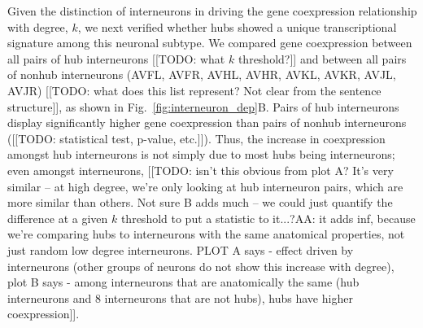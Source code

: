 \documentclass[10pt,letterpaper]{article}
\begin{document}
Given the distinction of interneurons in driving the gene coexpression relationship with degree, $k$, we next verified whether hubs showed a unique transcriptional signature among this neuronal subtype.
We compared gene coexpression between all pairs of hub interneurons [[TODO: what $k$ threshold?]] and between all pairs of nonhub interneurons (AVFL, AVFR, AVHL, AVHR, AVKL, AVKR, AVJL, AVJR) [[TODO: what does this list represent? Not clear from the sentence structure]], as shown in Fig.~\ref{fig:interneuron_dep}B.
Pairs of hub interneurons display significantly higher gene coexpression than pairs of nonhub interneurons ([[TODO: statistical test, p-value, etc.]]).
Thus, the increase in coexpression amongst hub interneurons is not simply due to most hubs being interneurons;  even amongst interneurons, [[TODO: isn't this obvious from plot A? It's very similar -- at high degree, we're only looking at hub interneuron pairs, which are more similar than others. Not sure B adds much -- we could just quantify the difference at a given $k$ threshold to put a statistic to it...?AA: it adds inf, because we're comparing hubs to interneurons with the same anatomical properties, not just random low degree interneurons. PLOT A says - effect driven by interneurons (other groups of neurons do not show this increase with degree), plot B says - among interneurons that are anatomically the same (hub interneurons and 8 interneurons that are not hubs), hubs have higher coexpression]].\\
\end{document}
